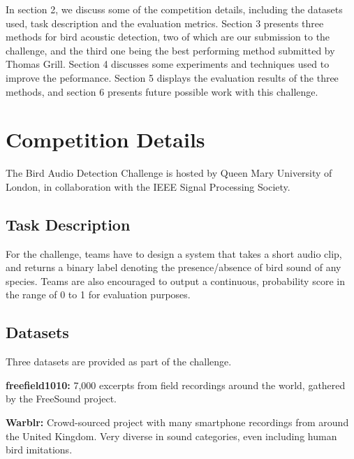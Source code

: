 \documentclass[10pt,twocolumn,letterpaper]{article}
\begin{document}
In section 2, we discuss some of the competition details, including the
datasets used, task description and the evaluation metrics. Section 3
presents three methods for bird acoustic detection, two of which are our
submission to the challenge, and the third one being the best performing
method submitted by Thomas Grill. Section 4 discusses some experiments and
techniques used to improve the peformance. Section 5 displays the
evaluation results of the three methods, and section 6 presents future
possible work with this challenge.

\section{Competition Details}

The Bird Audio Detection Challenge is hosted by Queen Mary University of
London, in collaboration with the IEEE Signal Processing Society.

\subsection{Task Description}

For the challenge, teams have to design a system that takes a short audio
clip, and returns a binary label denoting the presence/absence of bird
sound of any species. Teams are also encouraged to output a continuous,
probability score in the range of 0 to 1 for evaluation purposes.

\subsection{Datasets}

Three datasets are provided as part of the challenge.


\textbf{freefield1010:} 7,000 excerpts from field recordings around the
world, gathered by the FreeSound project.

\textbf{Warblr:} Crowd-sourced project with many smartphone recordings from
around the United Kingdom. Very diverse in sound categories, even including
human bird imitations.

\end{document}
